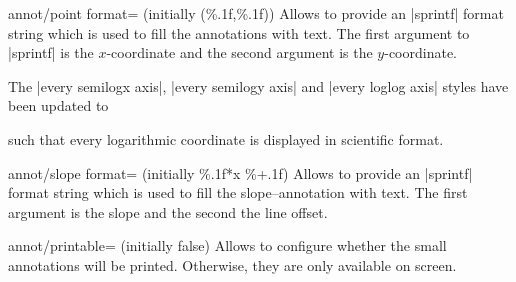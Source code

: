 \begin{pgfplotskey}{annot/point format= (initially {(\%.1f,\%.1f)})}
	Allows to provide an |sprintf| format string which is used to fill the annotations with text. 
	The first argument to |sprintf| is the $x$-coordinate and the second argument is the $y$-coordinate.

	The |every semilogx axis|, |every semilogy axis| and |every loglog axis| styles have been updated to
\begin{codeexample}
\end{codeexample}
	\noindent such that every logarithmic coordinate is displayed in scientific format.
\end{pgfplotskey}

\begin{pgfplotskey}{annot/slope format= (initially \%.1f*x \%+.1f)}
	Allows to provide an |sprintf| format string which is used to fill the slope--annotation with text.
	The first argument is the slope and the second the line offset.
\end{pgfplotskey}

\begin{pgfplotskey}{annot/printable= (initially false)}
	Allows to configure whether the small annotations will be printed. Otherwise, they are only available on screen.
\end{pgfplotskey}

